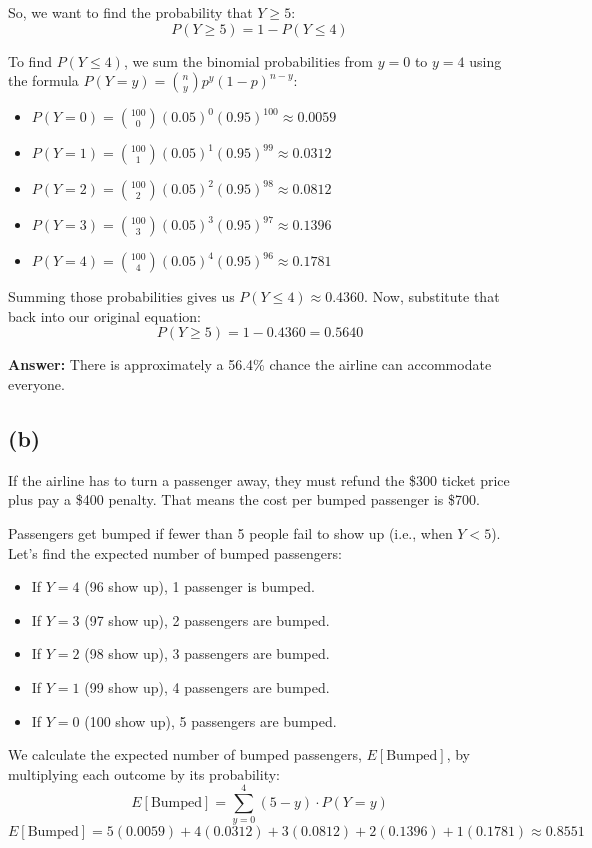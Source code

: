So, we want to find the probability that $Y \ge 5$:
$$P(Y \ge 5) = 1 - P(Y \le 4)$$

To find $P(Y \le 4)$, we sum the binomial probabilities from $y=0$ to $y=4$ using the formula $P(Y=y) = \binom{n}{y} p^y (1-p)^{n-y}$:
\begin{itemize}
    \item $P(Y=0) = \binom{100}{0}(0.05)^0(0.95)^{100} \approx 0.0059$
    \item $P(Y=1) = \binom{100}{1}(0.05)^1(0.95)^{99} \approx 0.0312$
    \item $P(Y=2) = \binom{100}{2}(0.05)^2(0.95)^{98} \approx 0.0812$
    \item $P(Y=3) = \binom{100}{3}(0.05)^3(0.95)^{97} \approx 0.1396$
    \item $P(Y=4) = \binom{100}{4}(0.05)^4(0.95)^{96} \approx 0.1781$
\end{itemize}

Summing those probabilities gives us $P(Y \le 4) \approx 0.4360$. 
Now, substitute that back into our original equation:
$$P(Y \ge 5) = 1 - 0.4360 = 0.5640$$

\textbf{Answer:} There is approximately a 56.4\% chance the airline can accommodate everyone.

\vspace{1em}

\subsection*{(b)}

If the airline has to turn a passenger away, they must refund the \$300 ticket price plus pay a \$400 penalty. That means the cost per bumped passenger is \$700.

Passengers get bumped if fewer than 5 people fail to show up (i.e., when $Y < 5$). Let's find the expected number of bumped passengers:
\begin{itemize}
    \item If $Y=4$ (96 show up), 1 passenger is bumped.
    \item If $Y=3$ (97 show up), 2 passengers are bumped.
    \item If $Y=2$ (98 show up), 3 passengers are bumped.
    \item If $Y=1$ (99 show up), 4 passengers are bumped.
    \item If $Y=0$ (100 show up), 5 passengers are bumped.
\end{itemize}

We calculate the expected number of bumped passengers, $E[\text{Bumped}]$, by multiplying each outcome by its probability:
$$E[\text{Bumped}] = \sum_{y=0}^{4} (5-y) \cdot P(Y=y)$$
$$E[\text{Bumped}] = 5(0.0059) + 4(0.0312) + 3(0.0812) + 2(0.1396) + 1(0.1781) \approx 0.8551$$

